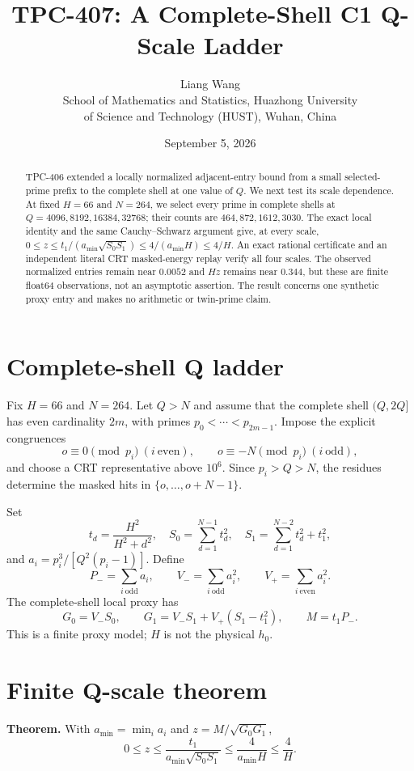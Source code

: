 \documentclass[11pt]{article}
\title{TPC-407: A Complete-Shell C1 Q-Scale Ladder}
\author{Liang Wang\\School of Mathematics and Statistics, Huazhong University\\of Science and Technology (HUST), Wuhan, China}
\date{September 5, 2026}
\begin{document}
\maketitle

\begin{abstract}
TPC-406 extended a locally normalized adjacent-entry bound from a small
selected-prime prefix to the complete shell at one value of $Q$.  We next
test its scale dependence.  At fixed $H=66$ and $N=264$, we select every prime
in complete shells at $Q=4096,8192,16384,32768$; their counts are
$464,872,1612,3030$.  The exact local identity and the same
Cauchy--Schwarz argument give, at every scale,
$0\leq z\leq t_1/(a_{\min}\sqrt{S_0S_1})\leq4/(a_{\min}H)\leq4/H$.
An exact rational certificate and an independent literal CRT masked-energy
replay verify all four scales.  The observed normalized entries remain
near $0.0052$ and $H z$ remains near $0.344$, but these are finite
float64 observations, not an asymptotic assertion.  The result concerns one
synthetic proxy entry and makes no arithmetic or twin-prime claim.
\end{abstract}

\section{Complete-shell Q ladder}
Fix $H=66$ and $N=264$.  Let $Q>N$ and assume that the complete shell
$(Q,2Q]$ has even cardinality $2m$, with primes
$p_0<\cdots<p_{2m-1}$.  Impose the explicit congruences
\[
 o\equiv0\pmod {p_i}\ (i\ \mathrm{even}),\qquad
 o\equiv-N\pmod {p_i}\ (i\ \mathrm{odd}),
\]
and choose a CRT representative above $10^6$.  Since $p_i>Q>N$, the
residues determine the masked hits in $\{o,\ldots,o+N-1\}$.

Set
\[
 t_d=\frac{H^2}{H^2+d^2},\quad
 S_0=\sum_{d=1}^{N-1}t_d^2,\quad
 S_1=\sum_{d=1}^{N-2}t_d^2+t_1^2,
\]
and $a_i=p_i^3/[Q^2(p_i-1)]$.  Define
\[
 P_- =\sum_{i\ \mathrm{odd}}a_i,\qquad
 V_- =\sum_{i\ \mathrm{odd}}a_i^2,\qquad
 V_+ =\sum_{i\ \mathrm{even}}a_i^2.
\]
The complete-shell local proxy has
\[
 G_0=V_-S_0,\qquad G_1=V_-S_1+V_+(S_1-t_1^2),\qquad M=t_1P_-.
\]
This is a finite proxy model; $H$ is not the physical $h_0$.

\section{Finite Q-scale theorem}
\textbf{Theorem.}  With $a_{\min}=\min_i a_i$ and
$z=M/\sqrt{G_0G_1}$,
\[
 0\leq z\leq\frac{t_1}{a_{\min}\sqrt{S_0S_1}}
 \leq\frac{4}{a_{\min}H}\leq\frac4H. \tag{1}
\]
\end{document}
